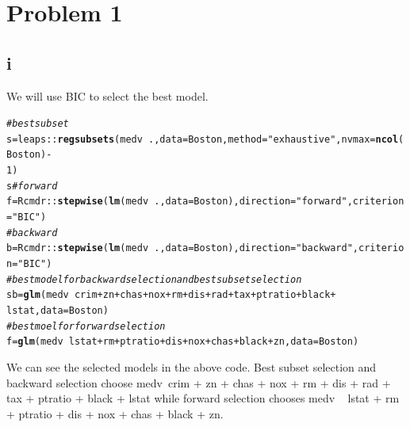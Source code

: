 \documentclass{article}\usepackage[]{graphicx}\usepackage[]{color}
\makeatletter
\newcommand{\hlnum}[1]{\textcolor[rgb]{0.686,0.059,0.569}{#1}}%
\newcommand{\hlstr}[1]{\textcolor[rgb]{0.192,0.494,0.8}{#1}}%
\newcommand{\hlcom}[1]{\textcolor[rgb]{0.678,0.584,0.686}{\textit{#1}}}%
\newcommand{\hlopt}[1]{\textcolor[rgb]{0,0,0}{#1}}%
\newcommand{\hlstd}[1]{\textcolor[rgb]{0.345,0.345,0.345}{#1}}%
\newcommand{\hlkwb}[1]{\textcolor[rgb]{0.69,0.353,0.396}{#1}}%
\newcommand{\hlkwc}[1]{\textcolor[rgb]{0.333,0.667,0.333}{#1}}%
\newcommand{\hlkwd}[1]{\textcolor[rgb]{0.737,0.353,0.396}{\textbf{#1}}}%
\newenvironment{kframe}{%
 \def\at@end@of@kframe{}%
 \ifinner\ifhmode%
  \def\at@end@of@kframe{\end{minipage}}%
  \begin{minipage}{\columnwidth}%
 \fi\fi%
 \def\FrameCommand##1{\hskip\@totalleftmargin \hskip-\fboxsep
 \colorbox{shadecolor}{##1}\hskip-\fboxsep
     \hskip-\linewidth \hskip-\@totalleftmargin \hskip\columnwidth}%
 \MakeFramed {\advance\hsize-\width
   \@totalleftmargin\z@ \linewidth\hsize
   \@setminipage}}%
 {\par\unskip\endMakeFramed%
 \at@end@of@kframe}
\newenvironment{knitrout}{}{} %
\makeatother
\begin{document}
\section*{Problem 1}
\subsection*{i}
We will use BIC to select the best model.
\begin{knitrout}
\color{fgcolor}\begin{kframe}
\begin{alltt}
\hlcom{# best subset}
\hlstd{s} \hlkwb{=} \hlstd{leaps::}\hlkwd{regsubsets}\hlstd{(medv} \hlopt{~} \hlstd{.,} \hlkwc{data} \hlstd{= Boston,} \hlkwc{method} \hlstd{=} \hlstr{"exhaustive"}\hlstd{,} \hlkwc{nvmax} \hlstd{=} \hlkwd{ncol}\hlstd{(Boston)} \hlopt{-}
    \hlnum{1}\hlstd{)}
\hlstd{s}  \hlcom{#forward}
\hlstd{f} \hlkwb{=} \hlstd{Rcmdr::}\hlkwd{stepwise}\hlstd{(}\hlkwd{lm}\hlstd{(medv} \hlopt{~} \hlstd{.,} \hlkwc{data} \hlstd{= Boston),} \hlkwc{direction} \hlstd{=} \hlstr{"forward"}\hlstd{,} \hlkwc{criterion} \hlstd{=} \hlstr{"BIC"}\hlstd{)}
\hlcom{# backward}
\hlstd{b} \hlkwb{=} \hlstd{Rcmdr::}\hlkwd{stepwise}\hlstd{(}\hlkwd{lm}\hlstd{(medv} \hlopt{~} \hlstd{.,} \hlkwc{data} \hlstd{= Boston),} \hlkwc{direction} \hlstd{=} \hlstr{"backward"}\hlstd{,} \hlkwc{criterion} \hlstd{=} \hlstr{"BIC"}\hlstd{)}
\hlcom{# best model for backward selection and best subset selection}
\hlstd{sb} \hlkwb{=} \hlkwd{glm}\hlstd{(medv} \hlopt{~} \hlstd{crim} \hlopt{+} \hlstd{zn} \hlopt{+} \hlstd{chas} \hlopt{+} \hlstd{nox} \hlopt{+} \hlstd{rm} \hlopt{+} \hlstd{dis} \hlopt{+} \hlstd{rad} \hlopt{+} \hlstd{tax} \hlopt{+} \hlstd{ptratio} \hlopt{+} \hlstd{black} \hlopt{+}
    \hlstd{lstat,} \hlkwc{data} \hlstd{= Boston)}
\hlcom{# best moel for forward selection}
\hlstd{f} \hlkwb{=} \hlkwd{glm}\hlstd{(medv} \hlopt{~} \hlstd{lstat} \hlopt{+} \hlstd{rm} \hlopt{+} \hlstd{ptratio} \hlopt{+} \hlstd{dis} \hlopt{+} \hlstd{nox} \hlopt{+} \hlstd{chas} \hlopt{+} \hlstd{black} \hlopt{+} \hlstd{zn,} \hlkwc{data} \hlstd{= Boston)}
\end{alltt}
\end{kframe}
\end{knitrout}


We can see the selected models in the above code. Best subset selection and backward selection choose medv~crim + zn + chas + nox + rm + dis + rad + tax + ptratio + black + lstat while forward selection chooses medv ~ lstat + rm + ptratio + dis + nox + chas + black + zn.
\end{document}
